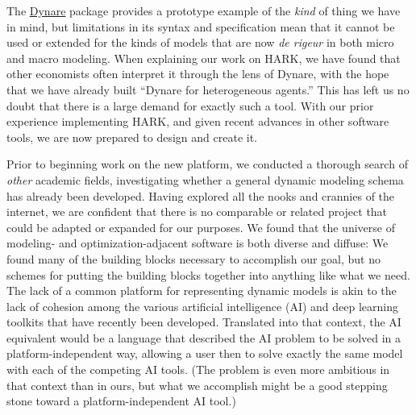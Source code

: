 \documentclass[11pt,pdftex,letterpaper]{article}
\begin{document}


The \href{https://www.dynare.org/}{Dynare} package provides a prototype example of the \textit{kind} of thing we have in mind, but limitations in its syntax and specification mean that it cannot be used or extended for the kinds of models that are now \textit{de rigeur} in both micro and macro modeling.  When explaining our work on HARK, we have found that other economists often interpret it through the lens of Dynare, with the hope that we have already built ``Dynare for heterogeneous agents.'' This has left us no doubt that there is a large demand for exactly such a tool. With our prior experience implementing HARK, and given recent advances in other software tools, we are now prepared to design and create it.

Prior to beginning work on the new platform, we conducted a thorough search of \textit{other} academic fields, investigating whether a general dynamic modeling schema has already been developed. Having explored all the nooks and crannies of the internet, we are confident that there is no comparable or related project that could be adapted or expanded for our purposes. We found that the universe of modeling- and optimization-adjacent software is both diverse and diffuse: We found many of the building blocks necessary to accomplish our goal, but no schemes for putting the building blocks together into anything like what we need. The lack of a common platform for representing dynamic models is akin to the lack of cohesion among the various artificial intelligence (AI) and deep learning toolkits that have recently been developed. Translated into that context, the AI equivalent would be a language that described the AI problem to be solved in a platform-independent way, allowing a user then to solve exactly the same model with each of the competing AI tools.  (The problem is even more ambitious in that context than in ours, but what we accomplish might be a good stepping stone toward a platform-independent AI tool.)

\end{document}
